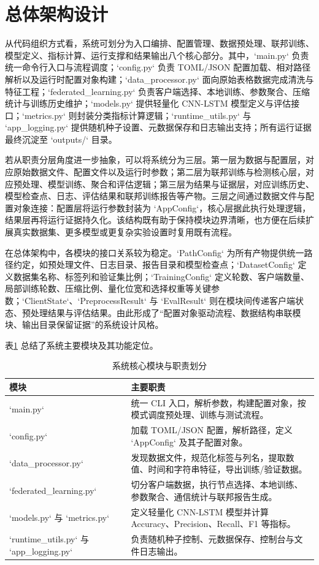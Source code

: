 \section{总体架构设计}
\label{sec:system-design-architecture}

从代码组织方式看，系统可划分为入口编排、配置管理、数据预处理、联邦训练、模型定义、指标计算、运行支撑和结果输出八个核心部分。其中，`main.py` 负责统一命令行入口与流程调度；`config.py` 负责 TOML/JSON 配置加载、相对路径解析以及运行时配置对象构建；`data\_processor.py` 面向原始表格数据完成清洗与特征工程；`federated\_learning.py` 负责客户端选择、本地训练、参数聚合、压缩统计与训练历史维护；`models.py` 提供轻量化 CNN-LSTM 模型定义与评估接口；`metrics.py` 则封装分类指标计算逻辑；`runtime\_utils.py` 与 `app\_logging.py` 提供随机种子设置、元数据保存和日志输出支持；所有运行证据最终沉淀至 `outputs/` 目录。

若从职责分层角度进一步抽象，可以将系统分为三层。第一层为数据与配置层，对应原始数据文件、配置文件以及运行时参数；第二层为联邦训练与检测核心层，对应预处理、模型训练、聚合和评估逻辑；第三层为结果与证据层，对应训练历史、模型检查点、日志、评估结果和联邦训练报告等产物。三层之间通过数据文件与配置对象连接：配置层将运行参数封装为 `AppConfig`，核心层据此执行处理逻辑，结果层再将运行证据持久化。该结构既有助于保持模块边界清晰，也方便在后续扩展真实数据集、更多模型或更复杂实验设置时复用既有流程。

在总体架构中，各模块的接口关系较为稳定。`PathConfig` 为所有产物提供统一路径约定，如预处理文件、日志目录、报告目录和模型检查点；`DatasetConfig` 定义数据集名称、标签列和验证集比例；`TrainingConfig` 定义轮数、客户端数量、局部训练轮数、压缩比例、量化位宽和选择权重等关键参数；`ClientState`、`PreprocessResult` 与 `EvalResult` 则在模块间传递客户端状态、预处理结果与评估结果。由此形成了“配置对象驱动流程、数据结构串联模块、输出目录保留证据”的系统设计风格。

表\ref{tab:system-modules} 总结了系统主要模块及其功能定位。

\begin{table}[htbp]
    \centering
    \caption{系统核心模块与职责划分}
    \label{tab:system-modules}
    \begin{tabular}{p{3.2cm}p{9.6cm}}
        \toprule
        模块 & 主要职责 \\
        \midrule
        `main.py` & 统一 CLI 入口，解析参数，构建配置对象，按模式调度预处理、训练与测试流程。 \\
        `config.py` & 加载 TOML/JSON 配置，解析路径，定义 `AppConfig` 及其子配置对象。 \\
        `data\_processor.py` & 发现数据文件，规范化标签与列名，提取数值、时间和字符串特征，导出训练/验证数据。 \\
        `federated\_learning.py` & 切分客户端数据，执行节点选择、本地训练、参数聚合、通信统计与联邦报告生成。 \\
        `models.py` 与 `metrics.py` & 定义轻量化 CNN-LSTM 模型并计算 Accuracy、Precision、Recall、F1 等指标。 \\
        `runtime\_utils.py` 与 `app\_logging.py` & 负责随机种子控制、元数据保存、控制台与文件日志输出。 \\
        \bottomrule
    \end{tabular}
\end{table}

